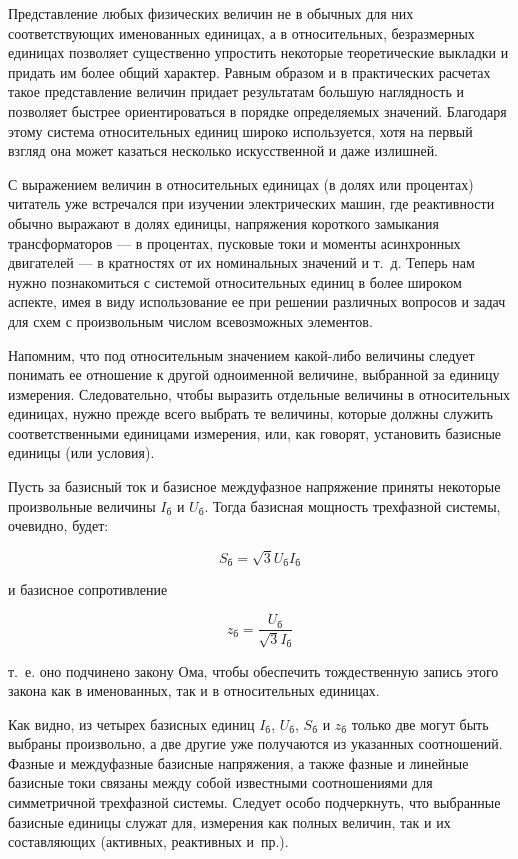 Представление любых физических величин не в обычных для них соответствующих именованных единицах, а в относительных, безразмерных единицах позволяет существенно упростить некоторые теоретические выкладки и придать им более общий характер. Равным образом и в практических расчетах такое представление величин придает результатам большую наглядность и позволяет быстрее ориентироваться в порядке определяемых значений. Благодаря этому система относительных единиц широко используется, хотя на первый взгляд она может казаться несколько искусственной и даже излишней.

С выражением величин в относительных единицах (в долях или процентах) читатель уже встречался при изучении электрических машин, где реактивности обычно выражают в долях единицы, напряжения короткого замыкания трансформаторов --- в процентах, пусковые токи и моменты асинхронных двигателей --- в кратностях от их номинальных значений и т.~д. Теперь нам нужно познакомиться с системой относительных единиц в более широком аспекте, имея в виду использование ее при решении различных вопросов и задач для схем с произвольным числом всевозможных элементов.

Напомним, что под относительным значением какой-либо величины следует понимать ее отношение к другой одноименной величине, выбранной за единицу измерения. Следовательно, чтобы выразить отдельные величины в относительных единицах, нужно прежде всего выбрать те величины, которые должны служить соответственными единицами измерения, или, как говорят, установить базисные единицы (или условия).

Пусть за базисный ток и базисное междуфазное напряжение приняты некоторые произвольные величины $ I_{\text{б}} $ и $ U_{\text{б}} $. Тогда базисная мощность трехфазной системы, очевидно, будет:

\begin{equation} %
	\label{eq:chap2 S_baz}
	S_{\text{б}} = \sqrt{3}U_{\text{б}}I_{\text{б}}
\end{equation}

и базисное сопротивление

\begin{equation} %
	\label{eq:chap2 z_baz}
	z_{\text{б}} = \frac{U_{\text{б}}}{\sqrt{3}I_{\text{б}}}
\end{equation}

т.~е. оно подчинено закону Ома, чтобы обеспечить тождественную запись этого закона как в именованных, так и в относительных единицах.

Как видно, из четырех базисных единиц $ I_{\text{б}} $, $ U_{\text{б}} $, $ S_{\text{б}} $ и $ z_{\text{б}} $ только две могут быть выбраны произвольно, а две другие уже получаются из указанных соотношений. Фазные и междуфазные базисные напряжения, а также фазные и линейные базисные токи связаны между собой известными соотношениями для симметричной трехфазной системы. Следует особо подчеркнуть, что выбранные базисные единицы служат для, измерения как полных величин, так и их составляющих (активных, реактивных и~пр.).

